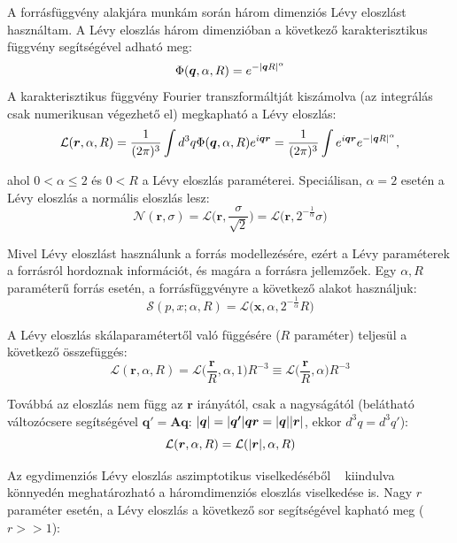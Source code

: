 \documentclass[10pt,a4paper]{article}
\numberwithin{equation}{subsection}
\numberwithin{figure}{section}
\begin{document}
A forrásfüggvény alakjára munkám során három dimenziós Lévy eloszlást használtam. A Lévy eloszlás három dimenzióban a következő karakterisztikus függvény segítségével adható meg:
\begin{equation}
\Phi(\bm{q}, \alpha, R) = e^{-\abs{\bm{q}R}^\alpha}
\end{equation}
A karakterisztikus függvény Fourier transzformáltját kiszámolva (az integrálás csak numerikusan végezhető el) megkapható a Lévy eloszlás:
\begin{equation}
\mathcal{L}(\bm{r},\alpha,R) = \frac{1}{(2\pi)^3}\int d^3q \Phi(\bm{q}, \alpha, R)e^{i\bm{qr}}= \frac{1}{(2\pi)^3}\int e^{i\bm{qr}}e^{-\abs{\bm{q}R}^\alpha},
 \label{eq:Levyint}
\end{equation}

ahol $0< \alpha \leq 2$ és $0<R$ a Lévy eloszlás paraméterei. Speciálisan, $\alpha=2$ esetén a Lévy eloszlás a normális eloszlás lesz:
\begin{equation}
\mathcal{N}(\bm{r},\sigma) = \mathcal{L}\bigg(\bm{r}, \frac{\sigma}{\sqrt{2}}\bigg) = \mathcal{L}\big(\bm{r}, 2^{-\frac{1}{\alpha}}\sigma\big)
\end{equation}

Mivel Lévy eloszlást használunk a forrás modellezésére, ezért a Lévy paraméterek a forrásról hordoznak információt, és magára a forrásra jellemzőek. Egy $\alpha, R$ paraméterű forrás esetén, a forrásfüggvényre a következő alakot használjuk:
\begin{equation}
\mathcal{S}(p,x; \alpha, R) =\mathcal{L}\big(\bm{x}, \alpha, 2^{-\frac{1}{\alpha}}R\big)
\end{equation}

A Lévy eloszlás skálaparamétertől való függésére ($R$ paraméter) teljesül a következő összefüggés:
\begin{equation}
\mathcal{L}(\bm{r}, \alpha, R) = \mathcal{L}\bigg(\frac{\bm{r}}{R}, \alpha, 1\bigg)R^{-3}\equiv \mathcal{L}\bigg(\frac{\bm{r}}{R}, \alpha\bigg)R^{-3}
\end{equation}

Továbbá az eloszlás nem függ az $\bm{r}$ irányától, csak a nagyságától (belátható változócsere segítségével $\bm{q'}=\bm{Aq}$: $\abs{\bm{q}}=\abs{\bm{q'}}\bm{qr}=\abs{\bm{q}}\abs{\bm{r}}$, ekkor $d^3 q=d^3 q'$):
\begin{equation}
\mathcal{L}(\bm{r}, \alpha, R)=\mathcal{L}(\abs{\bm{r}}, \alpha, R)
\end{equation}

Az egydimenziós Lévy eloszlás aszimptotikus viselkedéséből  ~\cite{LevyEff} kiindulva könnyedén meghatározható a háromdimenziós eloszlás viselkedése is. Nagy $r$ paraméter esetén, a Lévy eloszlás a következő sor segítségével kapható meg ($r>>1$):
\end{document}
